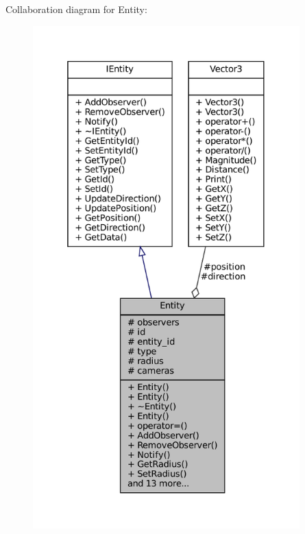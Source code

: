 Collaboration diagram for Entity\+:\nopagebreak
\begin{figure}[H]
\begin{center}
\leavevmode
\includegraphics[height=550pt]{classEntity__coll__graph}
\end{center}
\end{figure}

